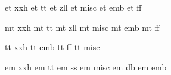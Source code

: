 %

et xxh
et tt
et zll
et misc
et emb
et ff

mt xxh
mt tt
mt zll
mt misc
mt emb
mt ff

tt xxh
tt emb
tt ff
tt misc

em xxh
em tt
em ss
em misc
em db
em emb